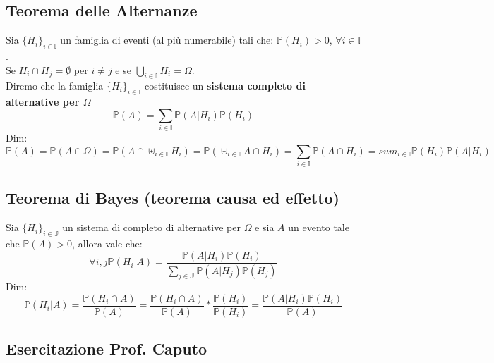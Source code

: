 \subsection{Teorema delle Alternanze}
Sia $\{H_i\}_{i \in \mathbb{I}}$ un famiglia di eventi (al più numerabile) tali che: $ \mathbb{P}(H_i) > 0 $, $ \forall i \in \mathbb{I} $.\\
Se $H_i \cap H_j = \emptyset$ per $i \neq j$ e se $\bigcup_{i \in \mathbb{I}}H_i = \Omega$.\\
Diremo che la famiglia $\{H_i\}_{i \in \mathbb{I}}$ costituisce un \textbf{sistema completo di alternative per $\Omega$}
$$ \mathbb{P}(A) = \sum_{i \in \mathbb{I}} \mathbb{P}(A|H_i) \mathbb{P}(H_i) $$
Dim:
$$ \mathbb{P}(A) = \mathbb{P}(A \cap \Omega) = \mathbb{P}(A \cap \uplus_{i \in \mathbb{I}} H_i) = \mathbb{P}(\uplus_{i \in \mathbb{I}} A \cap H_i) = \sum_{i \in \mathbb{I}} \mathbb{P}(A \cap H_i) = sum_{i \in \mathbb{I}} \mathbb{P}(H_i) \mathbb{P}(A|H_i) $$

\subsection{Teorema di Bayes (teorema causa ed effetto)}
Sia $\{H_i\}_{i \in \mathbb{J}}$ un sistema di completo di alternative per $\Omega$ e sia $A$ un evento tale che $\mathbb{P}(A) > 0$, allora vale che:
$$ \forall i,j \mathbb{P}(H_i|A) = \frac{\mathbb{P}(A|H_i) \mathbb{P}(H_i)}{\sum_{j \in \mathbb{J}} \mathbb{P}(A|H_j) \mathbb{P}(H_j) } $$
Dim:\\
$$ \mathbb{P}(H_i|A) = \frac{\mathbb{P}(H_i \cap A)}{\mathbb{P}(A)} = \frac{\mathbb{P}(H_i \cap A)}{\mathbb{P}(A)} * \frac{\mathbb{P}(H_i)}{\mathbb{P}(H_i)} = \frac{\mathbb{P}(A|H_i) \mathbb{P}(H_i)}{\mathbb{P}(A)} $$

\subsection{Esercitazione Prof. Caputo}

